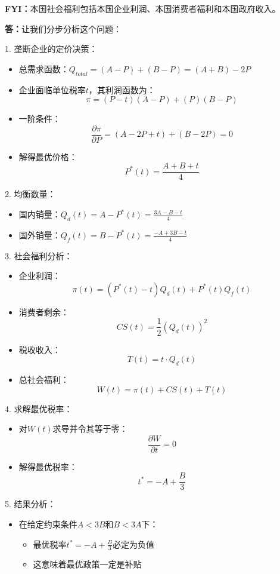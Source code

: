 \documentclass[12pt]{article}
\begin{document}
\noindent\textbf{FYI：}本国社会福利包括本国企业利润、本国消费者福利和本国政府收入。

\noindent\textbf{答：}让我们分步分析这个问题：

1. 垄断企业的定价决策：
\begin{itemize}
\item 总需求函数：$Q_{total}=(A-P)+(B-P)=(A+B)-2P$
\item 企业面临单位税率$t$，其利润函数为：
\[\pi=(P-t)(A-P)+(P)(B-P)\]
\item 一阶条件：
\[\frac{\partial \pi}{\partial P}=(A-2P+t)+(B-2P)=0\]
\item 解得最优价格：
\[P^*(t)=\frac{A+B+t}{4}\]
\end{itemize}

2. 均衡数量：
\begin{itemize}
\item 国内销量：$Q_d(t)=A-P^*(t)=\frac{3A-B-t}{4}$
\item 国外销量：$Q_f(t)=B-P^*(t)=\frac{-A+3B-t}{4}$
\end{itemize}

3. 社会福利分析：
\begin{itemize}
\item 企业利润：
\[\pi(t)=(P^*(t)-t)Q_d(t)+P^*(t)Q_f(t)\]
\item 消费者剩余：
\[CS(t)=\frac{1}{2}(Q_d(t))^2\]
\item 税收收入：
\[T(t)=t\cdot Q_d(t)\]
\item 总社会福利：
\[W(t)=\pi(t)+CS(t)+T(t)\]
\end{itemize}

4. 求解最优税率：
\begin{itemize}
\item 对$W(t)$求导并令其等于零：
\[\frac{\partial W}{\partial t}=0\]
\item 解得最优税率：
\[t^*=-A+\frac{B}{3}\]
\end{itemize}

5. 结果分析：
\begin{itemize}
\item 在给定约束条件$A<3B$和$B<3A$下：
    \begin{itemize}
    \item 最优税率$t^*=-A+\frac{B}{3}$必定为负值
    \item 这意味着最优政策一定是补贴
    \end{itemize}
\end{itemize}
\end{document}
